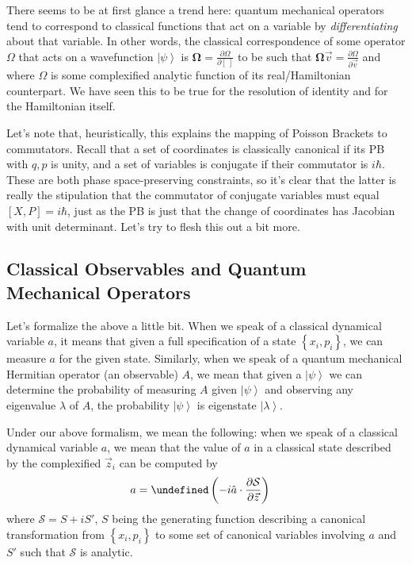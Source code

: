 \documentclass[10pt]{article}
\newcommand{\ket}[1]{\left|#1\right>}
\newcommand{\pd}[2]{\frac{\partial#1}{\partial#2}}
\let\Re\undefined
\DeclareMathOperator{\Re}{Re}
\begin{document}
There seems to be at first glance a trend here: quantum mechanical operators
tend to correspond to classical functions that act on a variable by
\emph{differentiating} about that variable. In other words, the classical
correspondence of some operator $\Omega$ that acts on a wavefunction
$\ket{\psi}$ is $\mathbf{\Omega} = \pd{\Omega}{[~]}$ to be such that
$\mathbf{\Omega}\vec{v} = \pd{\Omega}{\vec{v}}$ and where $\Omega$ is some
complexified analytic function of its real/Hamiltonian counterpart. We have seen
this to be true for the resolution of identity and for the Hamiltonian itself.

Let's note that, heuristically, this explains the mapping of Poisson Brackets
to commutators. Recall that a set of coordinates is classically canonical if its
PB with $q,p$ is unity, and a set of variables is conjugate if their commutator
is $i\hbar$. These are both phase space-preserving constraints, so it's clear
that the latter is really the stipulation that the commutator of conjugate
variables must equal $\left[ X,P \right] = i\hbar$, just as the PB is just that
the change of coordinates has Jacobian with unit determinant. Let's try to flesh
this out a bit more.

\subsection{Classical Observables and Quantum Mechanical Operators}

Let's formalize the above a little bit. When we speak of a classical dynamical
variable $a$, it means that given a full specification of a state $\left\{ x_i,
p_i\right\}$, we can measure $a$ for the given state. Similarly, when we speak
of a quantum mechanical Hermitian operator (an observable) $A$, we mean that
given a $\ket{\psi}$ we can determine the probability of measuring $A$ given
$\ket{\psi}$ and observing any eigenvalue $\lambda$ of $A$, the probability
$\ket{\psi}$ is eigenstate $\ket{\lambda}$.

Under our above formalism, we mean the following: when we speak of a classical
dynamical variable $a$, we mean that the value of $a$ in a classical state
described by the complexified $\vec{z}_i$ can be computed by
\begin{align}
    a &= \Re\left(-i\hat{a}\cdot \pd{\mathcal{S}}{\vec{z}}\right)
\end{align}
where $\mathcal{S} = S + iS'$, $S$ being the generating function describing a
canonical transformation from $\left\{ x_i, p_i \right\}$ to some set of
canonical variables involving $a$ and $S'$ such that $\mathcal{S}$ is analytic.
\end{document}
